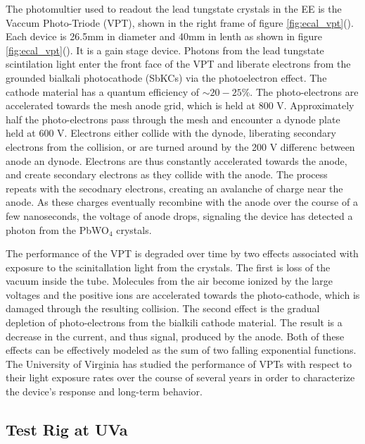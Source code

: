 \par The photomultier used to readout the lead tungstate crystals in
the EE is the Vaccum Photo-Triode (VPT), shown in the right frame of
figure \ref{fig:ecal_vpt}().  Each device is
26.5mm in diameter and 40mm in lenth as shown in figure
\ref{fig:ecal_vpt}().  It is a gain
stage device.  Photons from the lead tungstate scintilation light
enter the front face of the VPT and liberate electrons from the
grounded bialkali photocathode (SbKCs) via the photoelectron effect.
The cathode material has a quantum efficiency of $\sim20-25\%$.  The
photo-electrons are accelerated towards the mesh anode grid, which is
held at 800 V.  Approximately half the photo-electrons pass through
the mesh and encounter a dynode plate held at 600 V.  Electrons either
collide with the dynode, liberating secondary electrons from the
collision, or are turned around by the 200 V differenc between anode
an dynode.  Electrons are thus constantly accelerated towards the
anode, and create secondary electrons as they collide with the anode.
The process repeats with the secodnary electrons, creating an
avalanche of charge near the anode.  As these charges eventually
recombine with the anode over the course of a few nanoseconds, the
voltage of anode drops, signaling the device has detected a photon
from the PbWO$_{4}$ crystals.  

\par  The performance of the VPT is degraded over time by two effects
associated with exposure to the scinitallation light from the crystals.
The first is loss of the vacuum inside the tube.  Molecules from the
air become ionized by the large voltages and the positive ions are
accelerated towards the photo-cathode, which is damaged through the
resulting collision.  The second effect is the gradual depletion of
photo-electrons from the bialkili cathode material.  The result is a
decrease in the current, and thus signal, produced by the anode.  Both
of these effects can be effectively modeled as the sum of two falling
exponential functions.  The University of Virginia has studied the
performance of VPTs with respect to their light exposure rates over
the course of several years in order to characterize the device's
response and long-term behavior.   


\subsection{Test Rig at UVa}
\label{vpt_test_rig_description}

